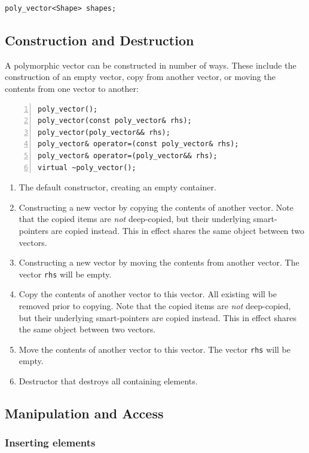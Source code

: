 \documentclass[10pt,a4paper,openany]{mudbook}
\newenvironment{enumeratedef}
  {\begin{enumerate}[topsep=0.5em,itemsep=0em,parsep=0em,font=\small]
     \small}
  {\end{enumerate}}
\begin{document}
\begin{lstlisting}[style=snippet]
poly_vector<Shape> shapes;
\end{lstlisting}

\subsection{Construction and Destruction}

A polymorphic vector can be constructed in number of ways. These include the
construction of an empty vector, copy from another vector, or moving the
contents from one vector to another:

\begin{lstlisting}[style=definition,numbers=left]
poly_vector();
poly_vector(const poly_vector& rhs);
poly_vector(poly_vector&& rhs);
poly_vector& operator=(const poly_vector& rhs);
poly_vector& operator=(poly_vector&& rhs);
virtual ~poly_vector();
\end{lstlisting}
\begin{enumeratedef}
  \item The default constructor, creating an empty container.
  \item Constructing a new vector by copying the contents of another vector.
        Note that the copied items are \emph{not} deep-copied, but their
        underlying smart-pointers are copied instead. This in effect shares
        the same object between two vectors.
  \item Constructing a new vector by moving the contents from another vector.
        The vector \texttt{rhs} will be empty.
  \item Copy the contents of another vector to this vector. All existing will
        be removed prior to copying. Note that the copied items are
        \emph{not} deep-copied, but their underlying smart-pointers are copied
        instead. This in effect shares the same object between two vectors.
  \item Move the contents of another vector to this vector. The vector
        \texttt{rhs} will be empty.
  \item Destructor that destroys all containing elements.
\end{enumeratedef}

\subsection{Manipulation and Access}

\subsubsection{Inserting elements}
\end{document}
